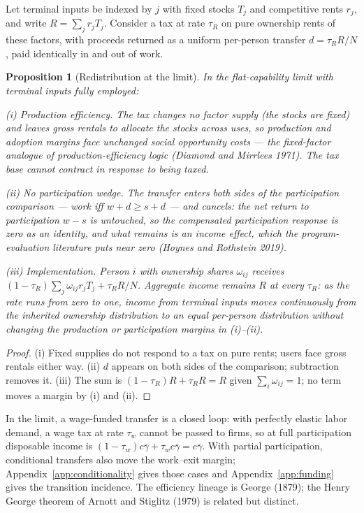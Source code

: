 \documentclass[12pt]{article}
\theoremstyle{plain}
\newtheorem{proposition}{Proposition}
\begin{document}
Let terminal inputs be indexed by $j$ with fixed stocks $T_j$ and competitive rents $r_j$, and write $R = \sum _j r_j T_j$. Consider a tax at rate $\tau _R$ on pure ownership rents of these factors, with proceeds returned as a uniform per-person transfer $d = \tau _R R/N$, paid identically in and out of work.

\begin{proposition}[Redistribution at the limit]\label{prop:welfare}
In the flat-capability limit with terminal inputs fully employed:

(i) \emph{Production efficiency.} The tax changes no factor supply (the stocks are fixed) and leaves gross rentals to allocate the stocks across uses, so production and adoption margins face unchanged social opportunity costs --- the fixed-factor analogue of production-efficiency logic (Diamond and Mirrlees 1971). The tax base cannot contract in response to being taxed.

(ii) \emph{No participation wedge.} The transfer enters both sides of the participation comparison --- work iff $w + d \ge s + d$ --- and cancels: the net return to participation $w - s$ is untouched, so the compensated participation response is zero as an identity, and what remains is an income effect, which the program-evaluation literature puts near zero (Hoynes and Rothstein 2019).

(iii) \emph{Implementation.} Person $i$ with ownership shares $\omega _{ij}$ receives $(1-\tau _R)\sum _j\omega _{ij}r_jT_j+\tau _RR/N$. Aggregate income remains $R$ at every $\tau _R$: as the rate runs from zero to one, income from terminal inputs moves continuously from the inherited ownership distribution to an equal per-person distribution without changing the production or participation margins in (i)--(ii).
\end{proposition}

\begin{proof}
(i) Fixed supplies do not respond to a tax on pure rents; users face gross rentals either way. (ii) $d$ appears on both sides of the comparison; subtraction removes it. (iii) The sum is $(1-\tau _R)R + \tau _R R = R$ given $\sum _i\omega _{ij} = 1$; no term moves a margin by (i) and (ii).
\end{proof}

In the limit, a wage-funded transfer is a closed loop: with perfectly elastic labor demand, a wage tax at rate $\tau_w$ cannot be passed to firms, so at full participation disposable income is $(1-\tau_w)c\bar{\gamma}+\tau_wc\bar{\gamma}=c\bar{\gamma}$. With partial participation, conditional transfers also move the work--exit margin; Appendix~\ref{app:conditionality} gives those cases and Appendix~\ref{app:funding} gives the transition incidence. The efficiency lineage is George (1879); the Henry George theorem of Arnott and Stiglitz (1979) is related but distinct.
\end{document}

